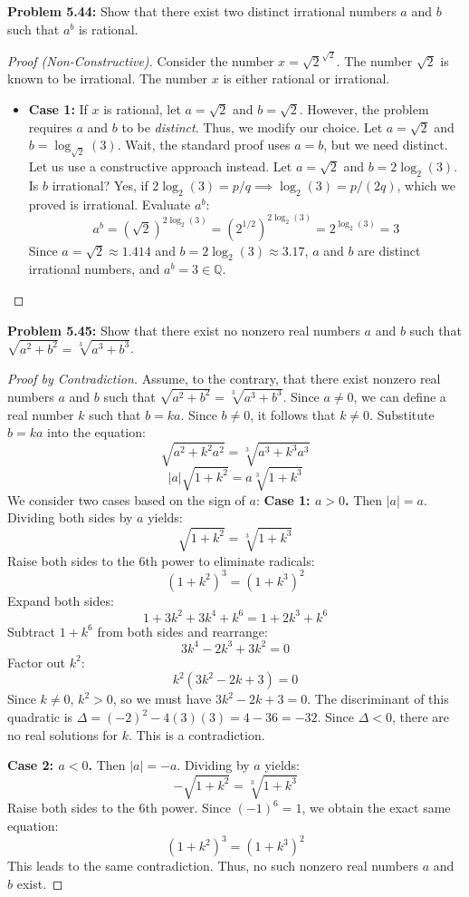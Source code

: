 \documentclass[11pt, a4paper]{article}
\theoremstyle{definition}
\theoremstyle{remark}
\newcommand{\Q}{\mathbb{Q}}
\begin{document}
\textbf{Problem 5.44:} Show that there exist two distinct irrational numbers $a$ and $b$ such that $a^b$ is rational.
\begin{proof}[Proof (Non-Constructive)]
    Consider the number $x = \sqrt{2}^{\sqrt{2}}$. The number $\sqrt{2}$ is known to be irrational. The number $x$ is either rational or irrational.
    \begin{itemize}
        \item \textbf{Case 1:} If $x$ is rational, let $a = \sqrt{2}$ and $b = \sqrt{2}$. However, the problem requires $a$ and $b$ to be \textit{distinct}. Thus, we modify our choice. Let $a = \sqrt{2}$ and $b = \log_{\sqrt{2}}(3)$. Wait, the standard proof uses $a=b$, but we need distinct. 
        Let us use a constructive approach instead. Let $a = \sqrt{2}$ and $b = 2\log_2(3)$. 
        Is $b$ irrational? Yes, if $2\log_2(3) = p/q \implies \log_2(3) = p/(2q)$, which we proved is irrational.
        Evaluate $a^b$:
        \[ a^b = (\sqrt{2})^{2\log_2(3)} = (2^{1/2})^{2\log_2(3)} = 2^{\log_2(3)} = 3 \]
        Since $a = \sqrt{2} \approx 1.414$ and $b = 2\log_2(3) \approx 3.17$, $a$ and $b$ are distinct irrational numbers, and $a^b = 3 \in \Q$.
    \end{itemize}
\end{proof}

\textbf{Problem 5.45:} Show that there exist no nonzero real numbers $a$ and $b$ such that $\sqrt{a^2+b^2} = \sqrt[3]{a^3+b^3}$.
\begin{proof}[Proof by Contradiction]
    Assume, to the contrary, that there exist nonzero real numbers $a$ and $b$ such that $\sqrt{a^2+b^2} = \sqrt[3]{a^3+b^3}$.
    Since $a \neq 0$, we can define a real number $k$ such that $b = ka$. Since $b \neq 0$, it follows that $k \neq 0$.
    Substitute $b = ka$ into the equation:
    \[ \sqrt{a^2 + k^2a^2} = \sqrt[3]{a^3 + k^3a^3} \]
    \[ |a|\sqrt{1+k^2} = a\sqrt[3]{1+k^3} \]
    We consider two cases based on the sign of $a$:
    \textbf{Case 1: $a > 0$.} Then $|a| = a$. Dividing both sides by $a$ yields:
    \[ \sqrt{1+k^2} = \sqrt[3]{1+k^3} \]
    Raise both sides to the 6th power to eliminate radicals:
    \[ (1+k^2)^3 = (1+k^3)^2 \]
    Expand both sides:
    \[ 1 + 3k^2 + 3k^4 + k^6 = 1 + 2k^3 + k^6 \]
    Subtract $1+k^6$ from both sides and rearrange:
    \[ 3k^4 - 2k^3 + 3k^2 = 0 \]
    Factor out $k^2$:
    \[ k^2(3k^2 - 2k + 3) = 0 \]
    Since $k \neq 0$, $k^2 > 0$, so we must have $3k^2 - 2k + 3 = 0$. The discriminant of this quadratic is $\Delta = (-2)^2 - 4(3)(3) = 4 - 36 = -32$. Since $\Delta < 0$, there are no real solutions for $k$. This is a contradiction.
    
    \textbf{Case 2: $a < 0$.} Then $|a| = -a$. Dividing by $a$ yields:
    \[ -\sqrt{1+k^2} = \sqrt[3]{1+k^3} \]
    Raise both sides to the 6th power. Since $(-1)^6 = 1$, we obtain the exact same equation:
    \[ (1+k^2)^3 = (1+k^3)^2 \]
    This leads to the same contradiction. Thus, no such nonzero real numbers $a$ and $b$ exist.
\end{proof}
\end{document}
